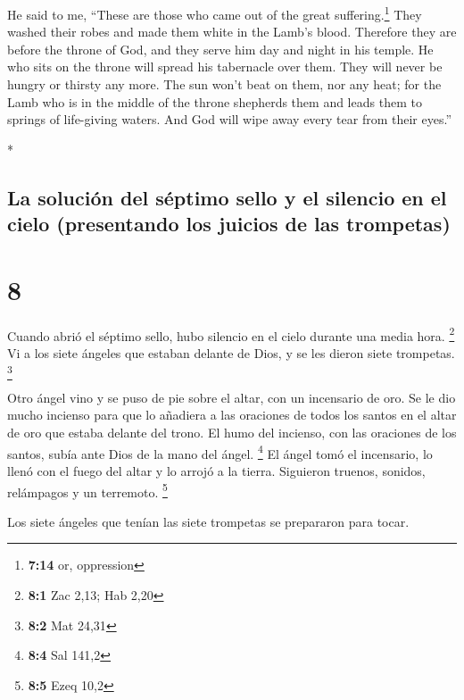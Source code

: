 \begin{paracol}{2}
\begin{otherlanguage}{english}
He said to me, ``These are those who came out of the great
suffering.\footnote{\textbf{7:14} or, oppression} They washed their
robes and made them white in the Lamb's blood.  Therefore
they are before the throne of God, and they serve him day and night in
his temple. He who sits on the throne will spread his tabernacle over
them.  They will never be hungry or thirsty any more. The
sun won't beat on them, nor any heat;  for the Lamb who
is in the middle of the throne shepherds them and leads them to springs
of life-giving waters. And God will wipe away every tear from their
eyes.''

\end{otherlanguage}

\switchcolumn[0]*

\hypertarget{la-soluciuxf3n-del-suxe9ptimo-sello-y-el-silencio-en-el-cielo-presentando-los-juicios-de-las-trompetas}{%
\subsection{La solución del séptimo sello y el silencio en el cielo
(presentando los juicios de las
trompetas)}\label{la-soluciuxf3n-del-suxe9ptimo-sello-y-el-silencio-en-el-cielo-presentando-los-juicios-de-las-trompetas}}

\hypertarget{section-14}{%
\section{8}\label{section-14}}

 Cuando abrió el séptimo sello, hubo silencio en el cielo
durante una media hora. \footnote{\textbf{8:1} Zac 2,13; Hab 2,20}
 Vi a los siete ángeles que estaban delante de Dios, y se
les dieron siete trompetas. \footnote{\textbf{8:2} Mat 24,31}

 Otro ángel vino y se puso de pie sobre el altar, con un
incensario de oro. Se le dio mucho incienso para que lo añadiera a las
oraciones de todos los santos en el altar de oro que estaba delante del
trono.  El humo del incienso, con las oraciones de los
santos, subía ante Dios de la mano del ángel. \footnote{\textbf{8:4} Sal
  141,2}  El ángel tomó el incensario, lo llenó con el
fuego del altar y lo arrojó a la tierra. Siguieron truenos, sonidos,
relámpagos y un terremoto. \footnote{\textbf{8:5} Ezeq 10,2}

 Los siete ángeles que tenían las siete trompetas se
prepararon para tocar.


\end{paracol}
